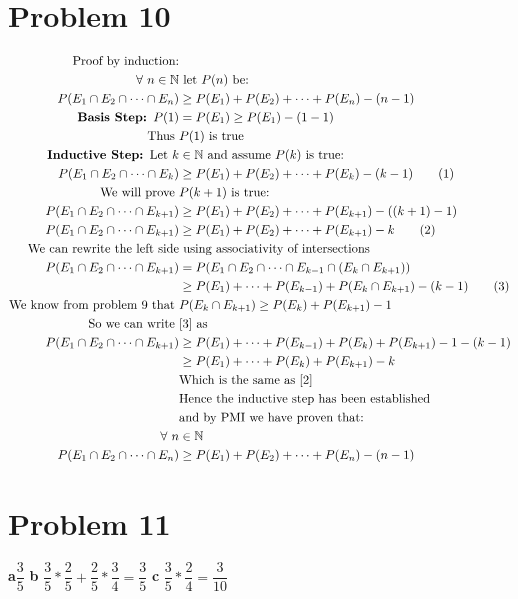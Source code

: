 \documentclass{article}
\begin{document}
\begin{flushleft}
\section*{Problem 10}
\begin{align*}
\text{Proof by induction:}&\\
\forall \ n \in \mathbb{N} &\text{ let } P(n) \text{ be:}\\
P(E_1\cap E_2\cap \cdots\cap E_n)&\geq P(E_1)+P(E_2)+\cdots+P(E_n)-(n-1)\\
\textbf{Basis Step: } P(1)&=P(E_1)\geq P(E_1)-(1-1)\\
\text{Thus } &P(1) \text{ is true}\\
\textbf{Inductive Step: } \text{Let } k&\in \mathbb{N} \text{ and assume }
P(k) \text{ is true:}\\
P(E_1\cap E_2\cap \cdots\cap E_k)&\geq P(E_1)+P(E_2)+\cdots+P(E_k)-(k-1) \label{1}\tag{1}\\
\text{We will prove } &P(k+1) \text{ is true:}\\
P(E_1\cap E_2\cap \cdots\cap E_{k+1})&\geq P(E_1)+P(E_2)+\cdots+P(E_{k+1})-((k+1)-1)\\
P(E_1\cap E_2\cap \cdots\cap E_{k+1})&\geq P(E_1)+P(E_2)+\cdots+P(E_{k+1})-k \label{2} \tag{2}\\
\text{We can rewrite the left side} &\text{ using associativity of intersections}\\
P(E_1\cap E_2\cap \cdots\cap E_{k+1})&=P(E_1\cap E_2\cap \cdots\cap E_{k-1}\cap (E_k\cap E_{k+1}))\\ 
&\geq P(E_1)+\cdots+P(E_{k-1})+P(E_k\cap E_{k+1})-(k-1) \label{3}\tag{3}\\
\text{We know from problem 9 that } &P(E_k\cap E_{k+1})\geq P(E_k)+P(E_{k+1})-1\\
\text{So we can write }& \eqref{3} \text{ as}\\
P(E_1\cap E_2\cap \cdots\cap E_{k+1})&\geq P(E_1)+\cdots+P(E_{k-1})+P(E_k) +P(E_{k+1})-1-(k-1)\\
&\geq P(E_1)+\cdots+P(E_k) +P(E_{k+1})-k \\
&\text{Which is the same as } \eqref{2}\\
&\text{Hence the inductive step has been established}\\
&\text{and by PMI we have proven that:}\\
\forall \ n &\in \mathbb{N} 
\\ P(E_1\cap E_2\cap \cdots\cap E_n)&\geq P(E_1)+P(E_2)+\cdots+P(E_n)-(n-1)
\end{align*}
\section*{Problem 11}
\textbf{a}\quad $\dfrac{3}{5}$\medbreak
\textbf{b} \quad
$\dfrac{3}{5} * \dfrac{2}{5} + \dfrac{2}{5}*\dfrac{3}{4}=\dfrac{3}{5}$\medbreak
\textbf{c}\quad
$\dfrac{3}{5}*\dfrac{2}{4}=\dfrac{3}{10}$

\end{flushleft}
\end{document}
